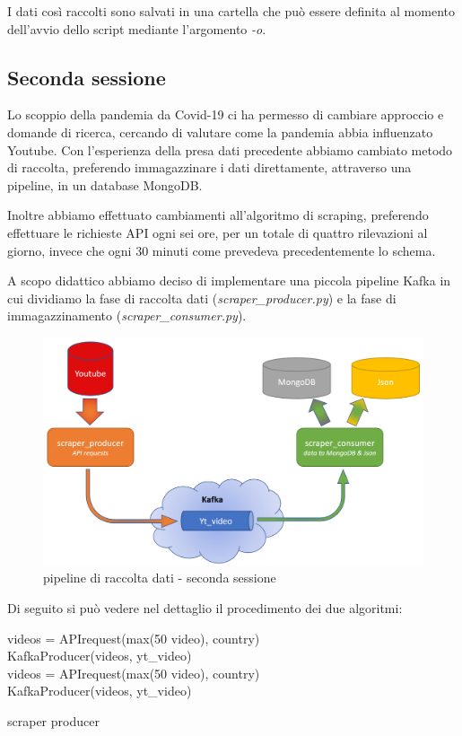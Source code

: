 I dati così raccolti sono salvati in una cartella che può essere definita al momento dell'avvio dello script mediante l'argomento \textit{-o}.

\subsection*{Seconda sessione}

Lo scoppio della pandemia da Covid-19 ci ha permesso di cambiare approccio e domande di ricerca, cercando di valutare come la pandemia abbia influenzato Youtube. Con l'esperienza della presa dati precedente abbiamo cambiato metodo di raccolta, preferendo immagazzinare i dati direttamente, attraverso una pipeline, in un database MongoDB.

Inoltre abbiamo effettuato cambiamenti all'algoritmo di scraping, preferendo effettuare le richieste API ogni sei ore, per un totale di quattro rilevazioni al giorno, invece che ogni 30 minuti come prevedeva precedentemente lo schema.

A scopo didattico abbiamo deciso di implementare una piccola pipeline Kafka in cui dividiamo la fase di raccolta dati (\textit{scraper\_producer.py}) e la fase di immagazzinamento (\textit{scraper\_consumer.py}). 

\begin{figure}[H]
	\centering
	\includegraphics[width=0.8\linewidth]{pics/pipeline.png}
	\caption{pipeline di raccolta dati - seconda sessione}
\end{figure}

Di seguito si può vedere nel dettaglio il procedimento dei due algoritmi:

\begin{algorithm}[H]
	\nl {} {
		\nl {}
		{
			\nl videos = APIrequest(max(50 video), country)\\
			\nl KafkaProducer(videos, yt\_video) \\ 
			\nl {}
			{
				\nl videos = APIrequest(max(50 video), country) \\
				\nl KafkaProducer(videos, yt\_video) \\
			}
		}
	}
	\caption{scraper producer}
\end{algorithm}

